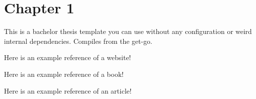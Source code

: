 \chapter{Chapter 1}
This is a bachelor thesis template you can use without any configuration or weird internal dependencies. Compiles from the get-go.

Here is an example reference of a website! \citep{google}

Here is an example reference of a book! \citep{goetz2006java}

Here is an example reference of an article! \cite{cattell2011scalable}